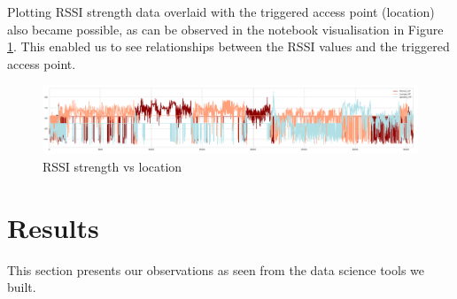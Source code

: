 \documentclass[fleqn,10pt]{SelfArx} %
\begin{document}
Plotting RSSI strength data overlaid with the triggered access point (location) also became possible, as can be observed in the notebook visualisation in Figure \ref{fig:rssi-signal}. This enabled us to see relationships between the RSSI values and the triggered access point. 

\begin{figure}[!h] \centering
	\includegraphics[scale=0.6]{rssi-signal} 
	\caption{RSSI strength vs location}
	\label{fig:rssi-signal}
\end{figure}


	\section{Results}
This section presents our observations as seen from the data science tools we built.
\end{document}
